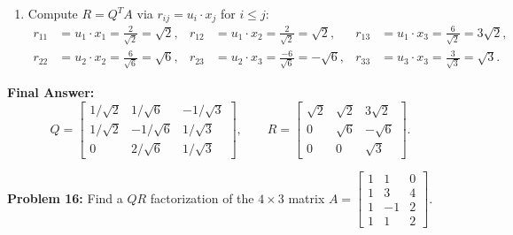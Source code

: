 \documentclass[11pt, letterpaper]{article}
\theoremstyle{definition}
\theoremstyle{remark}
\begin{document}
\begin{enumerate}[label=\textbf{Step \arabic*:}]
\[\begin{bmatrix}
            1/\sqrt{2} & 1/\sqrt{6} & -1/\sqrt{3} \\
            1/\sqrt{2} & -1/\sqrt{6} & 1/\sqrt{3} \\
            0 & 2/\sqrt{6} & 1/\sqrt{3}
        \end{bmatrix}.
    \]
    \item Compute $R = Q^T A$ via $r_{ij} = u_i \cdot x_j$ for $i \le j$:
    \begin{align*}
        r_{11} &= u_1 \cdot x_1 = \frac{2}{\sqrt{2}} = \sqrt{2}, & r_{12} &= u_1 \cdot x_2 = \frac{2}{\sqrt{2}} = \sqrt{2}, & r_{13} &= u_1 \cdot x_3 = \frac{6}{\sqrt{2}} = 3\sqrt{2}, \\
        r_{22} &= u_2 \cdot x_2 = \frac{6}{\sqrt{6}} = \sqrt{6}, & r_{23} &= u_2 \cdot x_3 = \frac{-6}{\sqrt{6}} = -\sqrt{6}, & r_{33} &= u_3 \cdot x_3 = \frac{3}{\sqrt{3}} = \sqrt{3}.
    \end{align*}
\end{enumerate}
\textbf{Final Answer:}
\[
    Q = \begin{bmatrix}
        1/\sqrt{2} & 1/\sqrt{6} & -1/\sqrt{3} \\
        1/\sqrt{2} & -1/\sqrt{6} & 1/\sqrt{3} \\
        0 & 2/\sqrt{6} & 1/\sqrt{3}
    \end{bmatrix}, \qquad
    R = \begin{bmatrix}
        \sqrt{2} & \sqrt{2} & 3\sqrt{2} \\
        0 & \sqrt{6} & -\sqrt{6} \\
        0 & 0 & \sqrt{3}
    \end{bmatrix}.
\]

\vspace{0.8em}

\textbf{Problem 16:} Find a $QR$ factorization of the $4 \times 3$ matrix $A = \begin{bmatrix} 1 & 1 & 0 \\ 1 & 3 & 4 \\ 1 & -1 & 2 \\ 1 & 1 & 2 \end{bmatrix}$.
\end{document}
